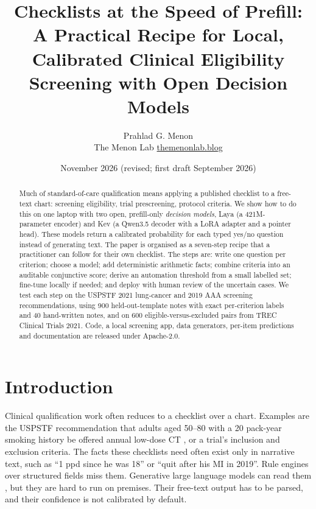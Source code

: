 \documentclass[11pt]{article}
\title{Checklists at the Speed of Prefill:\\[4pt]\large A Practical Recipe for Local, Calibrated Clinical Eligibility Screening with Open Decision Models}
\author{Prahlad G. Menon\\\small The Menon Lab \quad \href{https://themenonlab.blog}{themenonlab.blog}}
\date{November 2026 (revised; first draft September 2026)}
\begin{document}
\maketitle

\begin{abstract}
Much of standard-of-care qualification means applying a published checklist to a free-text chart: screening eligibility, trial prescreening, protocol criteria.
We show how to do this on one laptop with two open, prefill-only \emph{decision models}, Laya (a 421M-parameter encoder) and Kev (a Qwen3.5 decoder with a LoRA adapter and a pointer head).
These models return a calibrated probability for each typed yes/no question instead of generating text.
The paper is organised as a seven-step recipe that a practitioner can follow for their own checklist.
The steps are: write one question per criterion; choose a model; add deterministic arithmetic facts; combine criteria into an auditable conjunctive score; derive an automation threshold from a small labelled set; fine-tune locally if needed; and deploy with human review of the uncertain cases.
We test each step on the USPSTF 2021 lung-cancer and 2019 AAA screening recommendations, using 900 held-out-template notes with exact per-criterion labels and 40 hand-written notes, and on 600 eligible-versus-excluded pairs from TREC Clinical Trials 2021.
\AbstractResults{}
Code, a local screening app, data generators, per-item predictions and documentation are released under Apache-2.0.
\end{abstract}

\section{Introduction}
Clinical qualification work often reduces to a checklist over a chart.
Examples are the USPSTF recommendation that adults aged 50--80 with a 20 pack-year smoking history be offered annual low-dose CT \citep{krist2021lung}, or a trial's inclusion and exclusion criteria.
The facts these checklists need often exist only in narrative text, such as ``1 ppd since he was 18'' or ``quit after his MI in 2019''.
Rule engines over structured fields miss them.
Generative large language models can read them \citep{jin2024trialgpt,wornow2024zeroshot}, but they are hard to run on premises.
Their free-text output has to be parsed, and their confidence is not calibrated by default.
\end{document}
